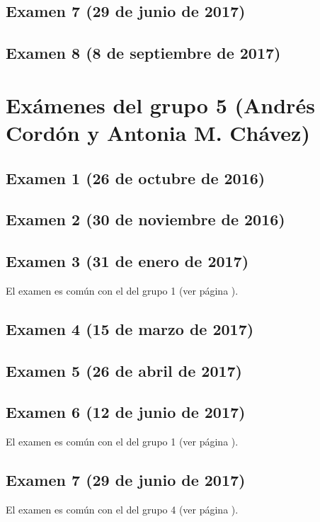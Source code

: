 \documentclass[a4paper,12pt,twoside]{book}
\begin{document}
\subsection{Examen 7 (29 de junio de 2017)}
  \label{examen_16_17_4_7}
\subsection{Examen 8 (8 de septiembre de 2017)}
  \label{examen_16_17_4_8}

\section{Exámenes del grupo 5 (Andrés Cordón y Antonia M. Chávez)}
\subsection{Examen 1 (26 de octubre de 2016)}
\subsection{Examen 2 (30 de noviembre de 2016)}
\subsection{Examen 3 (31 de enero de 2017)}
El examen es común con el del grupo 1 (ver página \pageref{examen_16_17_1_3}).
\subsection{Examen 4 (15 de marzo de 2017)}
\subsection{Examen 5 (26 de abril de 2017)}
\subsection{Examen 6 (12 de junio de 2017)} 
El examen es común con el del grupo 1 (ver página \pageref{examen_16_17_1_6}).
\subsection{Examen 7 (29 de junio de 2017)}
El examen es común con el del grupo 4 (ver página \pageref{examen_16_17_4_7}).
\end{document}
